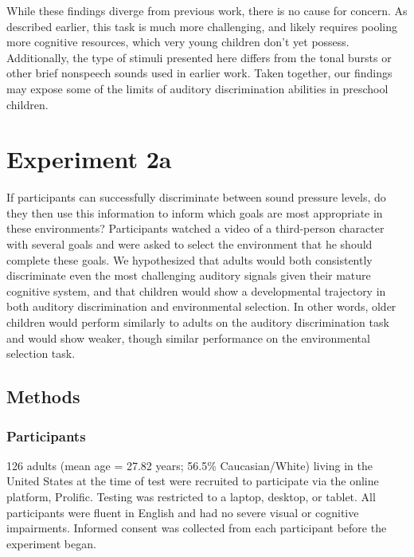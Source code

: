 \documentclass[10pt, letterpaper]{article}
\begin{document}
While these findings diverge from previous work, there is no cause for
concern. As described earlier, this task is much more challenging, and
likely requires pooling more cognitive resources, which very young
children don't yet possess. Additionally, the type of stimuli presented
here differs from the tonal bursts or other brief nonspeech sounds used
in earlier work. Taken together, our findings may expose some of the
limits of auditory discrimination abilities in preschool children.

\hypertarget{experiment-2a}{%
\section{\texorpdfstring{\textbf{Experiment
2a}}{Experiment 2a}}\label{experiment-2a}}

If participants can successfully discriminate between sound pressure
levels, do they then use this information to inform which goals are most
appropriate in these environments? Participants watched a video of a
third-person character with several goals and were asked to select the
environment that he should complete these goals. We hypothesized that
adults would both consistently discriminate even the most challenging
auditory signals given their mature cognitive system, and that children
would show a developmental trajectory in both auditory discrimination
and environmental selection. In other words, older children would
perform similarly to adults on the auditory discrimination task and
would show weaker, though similar performance on the environmental
selection task.

\hypertarget{methods-2}{%
\subsection{\texorpdfstring{\textbf{Methods}}{Methods}}\label{methods-2}}

\hypertarget{participants-2}{%
\subsubsection{Participants}\label{participants-2}}

126 adults (mean age = 27.82 years; 56.5\% Caucasian/White) living in
the United States at the time of test were recruited to participate via
the online platform, Prolific. Testing was restricted to a laptop,
desktop, or tablet. All participants were fluent in English and had no
severe visual or cognitive impairments. Informed consent was collected
from each participant before the experiment began.
\end{document}
